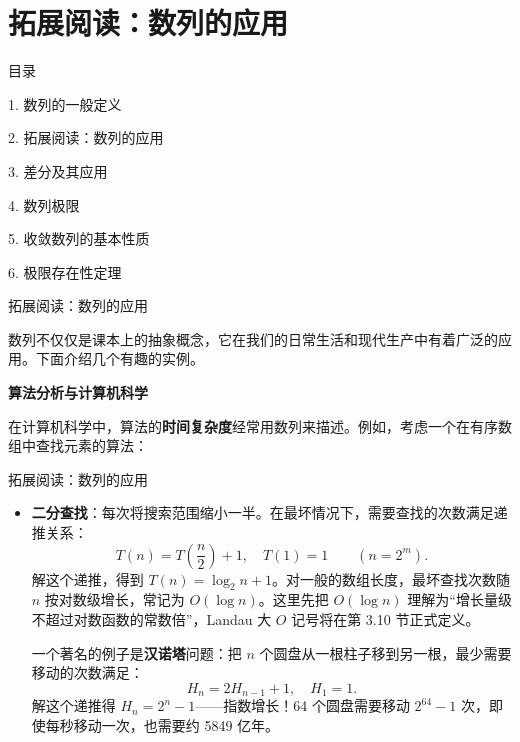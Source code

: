 \documentclass[aspectratio=169,10pt,fontset=fandol]{ctexbeamer}
\begin{document}
\section{拓展阅读：数列的应用}
\begin{frame}[t,fragile]{目录}
\normalsize
{\color{black}\normalsize 1. 数列的一般定义\par}\vspace{0.22em}
{\color{blue}\normalsize 2. 拓展阅读：数列的应用\par}\vspace{0.22em}
{\color{gray!40}\normalsize 3. 差分及其应用\par}\vspace{0.22em}
{\color{gray!40}\normalsize 4. 数列极限\par}\vspace{0.22em}
{\color{gray!40}\normalsize 5. 收敛数列的基本性质\par}\vspace{0.22em}
{\color{gray!40}\normalsize 6. 极限存在性定理\par}\vspace{0.22em}
\end{frame}
\begin{frame}[t,fragile]{拓展阅读：数列的应用}
\normalsize
{\normalsize
数列不仅仅是课本上的抽象概念，它在我们的日常生活和现代生产中有着广泛的应用。下面介绍几个有趣的实例。


}
{\normalsize
\textbf{算法分析与计算机科学}


}
{\normalsize
在计算机科学中，算法的\textbf{时间复杂度}经常用数列来描述。例如，考虑一个在有序数组中查找元素的算法：


}
\end{frame}
\begin{frame}[t,fragile]{拓展阅读：数列的应用}
\footnotesize
{\footnotesize
\begin{itemize}
\item \textbf{二分查找}：每次将搜索范围缩小一半。在最坏情况下，需要查找的次数满足递推关系：
\[
T(n) = T\left(\dfrac{n}{2}\right) + 1,\quad T(1) = 1\qquad(n=2^m).
\]
解这个递推，得到 \(T(n)=\log_2 n+1\)。对一般的数组长度，最坏查找次数随 $n$ 按对数级增长，常记为 \(O(\log n)\)。这里先把 \(O(\log n)\) 理解为“增长量级不超过对数函数的常数倍”，Landau 大 \(O\) 记号将在第 3.10 节正式定义。


一个著名的例子是\textbf{汉诺塔}问题：把 \(n\) 个圆盘从一根柱子移到另一根，最少需要移动的次数满足：
\[
H_n = 2H_{n-1} + 1,\quad H_1 = 1.
\]
解这个递推得 \(H_n = 2^n - 1\)——指数增长！64 个圆盘需要移动 \(2^{64}-1\) 次，即使每秒移动一次，也需要约 5849 亿年。
\end{itemize}
}
\end{frame}
\end{document}

